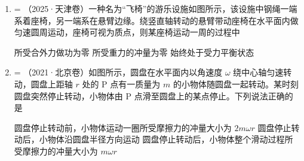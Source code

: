 \documentclass[\gkver]{gaokaozhenti}
\makeatletter
\newcommand{\tiinfo}[2]{{\small\color{gray}（#1）\textcolor{orange!85!black}{\nandu{#2}}}\hspace{0.4em}}
\newenvironment{tibody}
  {\begin{minipage}[t]{\linewidth}\@listdepth=\@ne\leavevmode\ignorespaces}
  {\end{minipage}}
\makeatother
\begin{document}
\begin{enumerate}[resume=tiku]
\item
\begin{tibody}
\tiinfo{2025·天津卷}{1}一种名为“飞椅”的游乐设施如图所示，该设施中钢绳一端系着座椅，另一端系在悬臂边缘。绕竖直轴转动的悬臂带动座椅在水平面内做匀速圆周运动，座椅可视为质点，则某座椅运动一周的过程中


{所受合外力做功为零}
{所受重力的冲量为零}
{始终处于受力平衡状态}
\end{tibody}


\item
\begin{tibody}
\tiinfo{2021·北京卷}{2}如图所示，圆盘在水平面内以角速度 $\omega$ 绕中心轴匀速转动，圆盘上距轴 $r$ 处的 P 点有一质量为 $m$ 的小物体随圆盘一起转动。某时刻圆盘突然停止转动，小物体由 P 点滑至圆盘上的某点停止。下列说法正确的是


{圆盘停止转动前，小物体运动一圈所受摩擦力的冲量大小为 $2m\omega r$}
{圆盘停止转动后，小物体沿圆盘半径方向运动}
{圆盘停止转动后，小物体整个滑动过程所受摩擦力的冲量大小为 $m\omega r$}
\end{tibody}


\end{enumerate}
\end{document}
